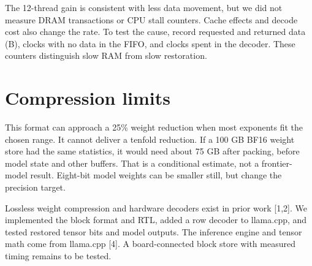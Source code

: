 \documentclass[10pt,letterpaper]{article}
\begin{document}
The 12-thread gain is consistent with less data movement, but we did not measure DRAM transactions or CPU stall counters. Cache effects and decode cost also change the rate. To test the cause, record requested and returned data (B), clocks with no data in the FIFO, and clocks spent in the decoder. These counters distinguish slow RAM from slow restoration.

\section{Compression limits}
This format can approach a 25\% weight reduction when most exponents fit the chosen range. It cannot deliver a tenfold reduction. If a 100 GB BF16 weight store had the same statistics, it would need about 75 GB after packing, before model state and other buffers. That is a conditional estimate, not a frontier-model result. Eight-bit model weights can be smaller still, but change the precision target.

Lossless weight compression and hardware decoders exist in prior work [1,2]. We implemented the block format and RTL, added a row decoder to llama.cpp, and tested restored tensor bits and model outputs. The inference engine and tensor math come from llama.cpp [4]. A board-connected block store with measured timing remains to be tested.

\newpage
\end{document}
